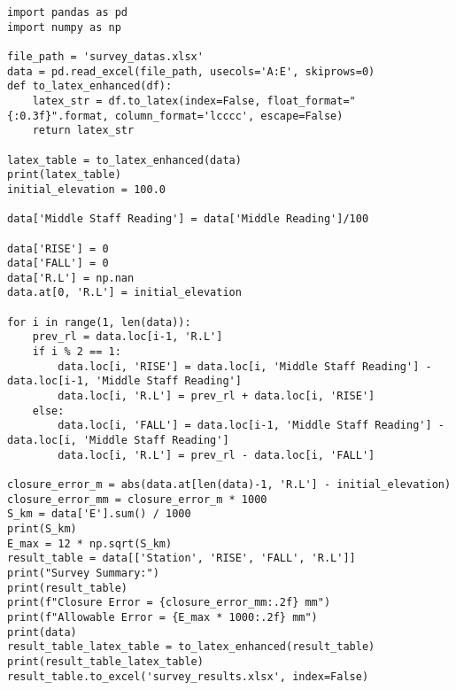 \documentclass[12pt]{report}
\begin{document}
\begin{lstlisting}[caption={Code for Errors and LaTeX}]
import pandas as pd
import numpy as np

file_path = 'survey_datas.xlsx'
data = pd.read_excel(file_path, usecols='A:E', skiprows=0)
def to_latex_enhanced(df):
    latex_str = df.to_latex(index=False, float_format="{:0.3f}".format, column_format='lcccc', escape=False)
    return latex_str

latex_table = to_latex_enhanced(data)
print(latex_table)
initial_elevation = 100.0

data['Middle Staff Reading'] = data['Middle Reading']/100

data['RISE'] = 0
data['FALL'] = 0
data['R.L'] = np.nan
data.at[0, 'R.L'] = initial_elevation

for i in range(1, len(data)):
    prev_rl = data.loc[i-1, 'R.L']
    if i % 2 == 1:
        data.loc[i, 'RISE'] = data.loc[i, 'Middle Staff Reading'] - data.loc[i-1, 'Middle Staff Reading']
        data.loc[i, 'R.L'] = prev_rl + data.loc[i, 'RISE']
    else:
        data.loc[i, 'FALL'] = data.loc[i-1, 'Middle Staff Reading'] - data.loc[i, 'Middle Staff Reading']
        data.loc[i, 'R.L'] = prev_rl - data.loc[i, 'FALL']

closure_error_m = abs(data.at[len(data)-1, 'R.L'] - initial_elevation)
closure_error_mm = closure_error_m * 1000
S_km = data['E'].sum() / 1000
print(S_km)
E_max = 12 * np.sqrt(S_km)
result_table = data[['Station', 'RISE', 'FALL', 'R.L']]
print("Survey Summary:")
print(result_table)
print(f"Closure Error = {closure_error_mm:.2f} mm")
print(f"Allowable Error = {E_max * 1000:.2f} mm")
print(data)
result_table_latex_table = to_latex_enhanced(result_table)
print(result_table_latex_table)
result_table.to_excel('survey_results.xlsx', index=False)

\end{lstlisting}
\end{document}
